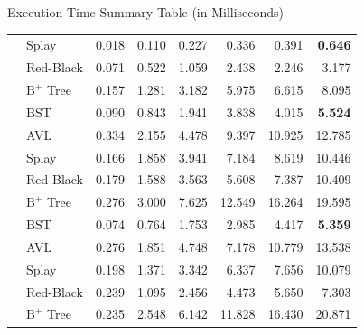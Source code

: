 \documentclass[aspectratio=169, 10pt, xcolor={x11names}]{beamer}
\begin{document}
\begin{frame}{Execution Time Summary Table (in Milliseconds)}
\begin{tabular}{@{}llrrrrrr@{}}
  & Splay     & 0.018 &  0.110 &   0.227 &   0.336 &    0.391 & \textbf{\color{progcolor}0.646} \\
  & Red-Black & 0.071 &  0.522 &   1.059 &   2.438 &    2.246 &    3.177 \\
  & $\text{B}^+$ Tree & 0.157 &  1.281 &   3.182 &   5.975 &    6.615 &    8.095 \\
\midrule
{}
  & BST       & 0.090 &  0.843 &   1.941 &   3.838 &    4.015 & \textbf{\color{progcolor}5.524} \\
  & AVL       & 0.334 &  2.155 &   4.478 &   9.397 &   10.925 &   12.785 \\
  & Splay     & 0.166 &  1.858 &   3.941 &   7.184 &    8.619 &   10.446 \\
  & Red-Black & 0.179 &  1.588 &   3.563 &   5.608 &    7.387 &   10.409 \\
  & $\text{B}^+$ Tree & 0.276 &  3.000 &   7.625 &  12.549 &   16.264 &   19.595 \\
\midrule
{}
  & BST       & 0.074 &  0.764 &   1.753 &   2.985 &    4.417 & \textbf{\color{progcolor}5.359} \\
  & AVL       & 0.276 &  1.851 &   4.748 &   7.178 &   10.779 &   13.538 \\
  & Splay     & 0.198 &  1.371 &   3.342 &   6.337 &    7.656 &   10.079 \\
  & Red-Black & 0.239 &  1.095 &   2.456 &   4.473 &    5.650 &    7.303 \\
  & $\text{B}^+$ Tree & 0.235 &  2.548 &   6.142 &  11.828 &   16.430 &   20.871 \\
\bottomrule
\end{tabular}
\end{frame}
\end{document}
